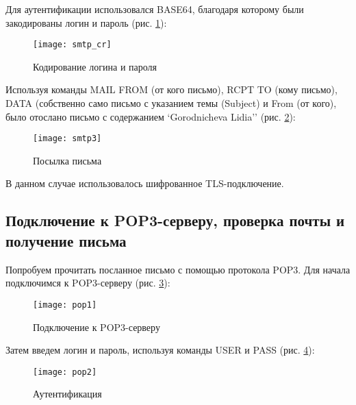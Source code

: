 Для аутентификации использовался BASE64, благодаря которому были закодированы логин и пароль (рис. \ref{pic:smtp_cr}):

\begin{figure}[H]
	\begin{center}
		\texttt{[image: smtp\_cr]}
		\caption{Кодирование логина и пароля} 
		\label{pic:smtp_cr} %
	\end{center}
\end{figure}

 Используя команды MAIL FROM (от кого письмо), RCPT TO (кому письмо), DATA (собственно само письмо с указанием темы (Subject) и From (от кого), было отослано письмо с содержанием `Gorodnicheva Lidia'' (рис. \ref{pic:smtp3}):

\begin{figure}[H]
	\begin{center}
		\texttt{[image: smtp3]}
		\caption{Посылка письма} 
		\label{pic:smtp3} %
	\end{center}
\end{figure}

В данном случае использовалось шифрованное TLS-подключение.

\subsection{Подключение к POP3-серверу, проверка почты и получение письма}

Попробуем прочитать посланное письмо с помощью протокола POP3. Для начала подключимся к POP3-серверу (рис. \ref{pic:pop1}):

\begin{figure}[H]
	\begin{center}
		\texttt{[image: pop1]}
		\caption{Подключение к POP3-серверу} 
		\label{pic:pop1} %
	\end{center}
\end{figure}

Затем введем логин и пароль, используя команды USER и PASS  (рис. \ref{pic:pop2}):

\begin{figure}[H]
	\begin{center}
		\texttt{[image: pop2]}
		\caption{Аутентификация} 
		\label{pic:pop2} %
	\end{center}
\end{figure}

